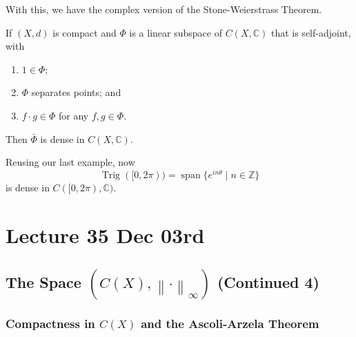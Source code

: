 \documentclass[notoc,notitlepage]{tufte-book}
\DeclareMathOperator{\Span}{span }
\DeclareMathOperator{\Trig}{Trig }
\newcommand{\norm}[1]{\left\| #1 \right\|}
\begin{document}
With this, we have the complex version of the Stone-Weierstrass Theorem.

\begin{thm}\label{thm:stone_weierstrass_theorem_complex_version}
  If $(X, d)$ is compact and $\Phi$ is a linear subspace of $C(X, \mathbb{C})$ that is self-adjoint, with
  \begin{enumerate}
    \item $1 \in \Phi$;
    \item $\Phi$ separates points; and
    \item $f \cdot g \in \Phi$ for any $f, g \in \Phi$.
  \end{enumerate}
  Then $\bar{\Phi}$ is dense in $C(X, \mathbb{C})$.
\end{thm}

\begin{eg}
  Reusing our last example, now
  \begin{equation*}
    \Trig([0, 2 \pi)) = \Span \{ e^{i n \theta} \mid n \in \mathbb{Z} \}
  \end{equation*}
  is dense in $C([0, 2 \pi), \mathbb{C})$.
\end{eg}





\chapter{Lecture 35 Dec 03rd}%
\label{chp:lecture_35_dec_03rd}

\section{The Space $(C(X), \norm\cdot_\infty)$ (Continued 4)}%
\label{sec:the_space_c_x_normcdot_infty_continued_4}

\subsection{Compactness in $C(X)$ and the Ascoli-Arzela Theorem}%
\label{sub:compactness_in_c_x_and_the_ascoli_arzela_theorem}
\end{document}
